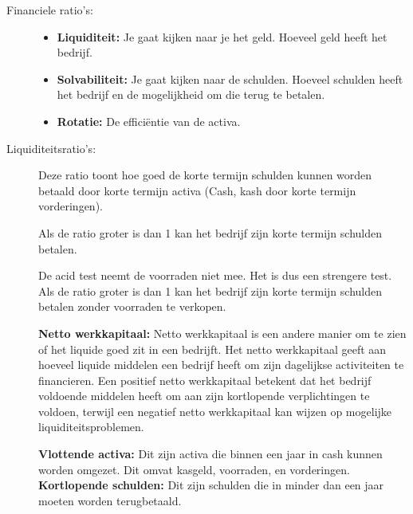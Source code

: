 \documentclass[a4paper,11pt]{article}
\begin{document}
\begin{description}

    \item[Financiele ratio's:\newline]
    \begin{itemize}
    \item \textbf{Liquiditeit:} Je gaat kijken naar je het geld. Hoeveel geld heeft 
    het bedrijf.
    \item \textbf{Solvabiliteit:} Je gaat kijken naar de schulden. Hoeveel schulden heeft het bedrijf en de mogelijkheid
    om die terug te betalen.
    \item \textbf{Rotatie:} De efficiëntie van de activa.
    \end{itemize}

    \item[Liquiditeitsratio's:] Deze ratio toont
    hoe goed de korte termijn schulden kunnen worden betaald door korte termijn activa (Cash, kash door korte termijn vorderingen).

    {Als de ratio groter is dan 1 kan het bedrijf zijn korte termijn schulden betalen.}

    De acid test neemt de voorraden niet mee. Het is dus een strengere test.
    {Als de ratio groter is dan 1 kan het bedrijf zijn korte termijn schulden betalen zonder voorraden te verkopen.}

    \textbf{Netto werkkapitaal:} 
    Netto werkkapitaal is een andere manier om te zien of het liquide goed zit in een bedrijft.
    {Het netto werkkapitaal geeft aan hoeveel liquide middelen een bedrijf heeft om zijn dagelijkse
    activiteiten te financieren. Een positief netto werkkapitaal betekent dat het bedrijf voldoende
    middelen heeft om aan zijn kortlopende verplichtingen te voldoen, 
    terwijl een negatief netto werkkapitaal
    kan wijzen op mogelijke liquiditeitsproblemen.}

    \begin{conceptbox}
        \textbf{Vlottende activa:} Dit zijn activa die binnen een jaar in cash kunnen worden omgezet.
        Dit omvat kasgeld, voorraden, en vorderingen.
        \newline
        \textbf{Kortlopende schulden:} Dit zijn schulden die in minder dan een jaar moeten worden terugbetaald.
    \end{conceptbox}


\end{description}
\end{document}

